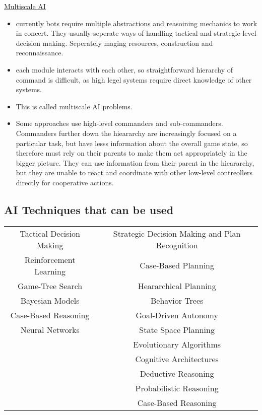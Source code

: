 \underline{Multiscale AI}
\begin{itemize}[noitemsep,nolistsep]
	\item currently bots require multiple abstractions and reasoining mechanics to work in concert. They usually seperate ways of handling tactical and strategic level decision making. Seperately maging resources, construction and reconnaissance.
	\item each module interacts with each other, so straightforward hierarchy of command is difficult, as high legel systems require direct knowledge of other systems.
	\item This is called multiscale AI problems.
	\item Some approaches use high-level commanders and sub-commanders. Commanders further down the hieararchy are increasingly focused on a particular task, but have lesss information about the overall game state, so therefore must rely on their parents to make them act appropriately in the bigger picture. They can use information from their parent in the hieararchy, but they are unable to react and coordinate with other low-level contreollers directly for cooperative actions.
\end{itemize}

\subsection{AI Techniques that can be used}
\begin{table}[h!]
	\centering
	\begin{tabular}{ c c }
		Tactical Decision Making & Strategic Decision Making and Plan Recognition\\
		Reinforcement Learning & Case-Based Planning\\
		Game-Tree Search & Heararchical Planning\\
		Bayesian Models & Behavior Trees\\
		Case-Based Reasoning & Goal-Driven Autonomy\\
		Neural Networks &  State Space Planning\\
		& Evolutionary Algorithms\\
		& Cognitive Architectures\\
		& Deductive Reasoning\\
		& Probabilistic Reasoning\\
		& Case-Based Reasoning\\
	\end{tabular}	
\end{table}


